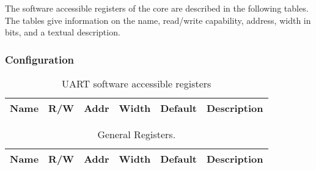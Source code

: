 
The software accessible registers of the core are described in the following
tables. The tables give information on the name, read/write capability, address, width in bits, and a textual description.
\subsubsection{ Configuration}
\begin{table}[H]
  \centering
  \begin{tabularx}{\textwidth}{|l|c|c|c|c|X|}

    \hline
    \rowcolor{iob-green}
    {\bf Name} & {\bf R/W} & {\bf Addr} & {\bf Width} & {\bf Default} & {\bf Description} \\ \hline

    

  \end{tabularx}
  \caption{UART software accessible registers}
  \label{_uart_csrs_tab:is}
\end{table}

\begin{table}[H]
  \centering
  \begin{tabularx}{\textwidth}{|l|c|c|c|c|X|}

    \hline
    \rowcolor{iob-green}
    {\bf Name} & {\bf R/W} & {\bf Addr} & {\bf Width} & {\bf Default} & {\bf Description} \\ \hline

    

  \end{tabularx}
  \caption{General Registers.}
  \label{_general_operation_csrs_tab:is}
\end{table}
\clearpage
